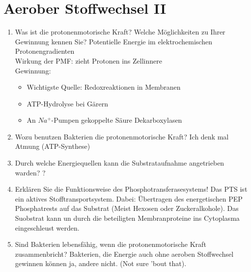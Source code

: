 
\section{Aerober Stoffwechsel II}
\begin{enumerate}
	\item Was ist die protonenmotorische Kraft? Welche Möglichkeiten zu Ihrer Gewinnung kennen Sie?
		Potentielle Energie im elektrochemischen Protonengradienten \\
		Wirkung der PMF: zieht Protonen ins Zellinnere \\
		Gewinnung:  \\
		\begin{itemize}
			\item Wichtigste Quelle: Redoxreaktionen in Membranen
			\item ATP-Hydrolyse bei G\"arern
			\item An $Na^+$-Pumpen gekoppelte S\"aure Dekarboxylasen	
		\end{itemize}

	\item Wozu benutzen Bakterien die protonenmotorische Kraft?
		Ich denk mal Atmung (ATP-Synthese) 
	\item Durch welche Energiequellen kann die Substrataufnahme angetrieben warden?
		?	
	\item Erklären Sie die Funktionsweise des Phosphotransferasesystems! Das PTS ist ein aktives Stofftransportsystem. Dabei: \"Ubertragen des energetischen PEP Phosphatrests auf das Substrat (Meist Hexosen oder Zuckeralkohole). Das Suobstrat kann un durch die beteiligten Membranproteine ins Cytoplasma eingeschleust werden.

	\item Sind Bakterien lebensfähig, wenn die protonenmotorische Kraft zusammenbricht? Bakterien, die Energie auch ohne aeroben Stoffwechsel gewinnen k\"onnen ja, andere nicht. (Not sure 'bout that). 
		

\end{enumerate}
